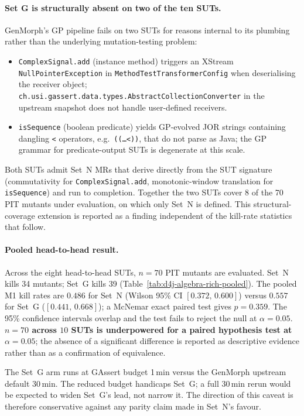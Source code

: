 \paragraph{Set G is structurally absent on two of the ten SUTs.}
GenMorph's GP pipeline fails on two SUTs for reasons internal to its
plumbing rather than the underlying mutation-testing problem:
\begin{itemize}[nosep,leftmargin=*]
  \item \texttt{ComplexSignal.add} (instance method) triggers an
        XStream \texttt{NullPointerException} in
        \texttt{MethodTestTransformerConfig} when deserialising the
        receiver object;
        \texttt{ch.usi.gassert.data.types.AbstractCollectionConverter}
        in the upstream snapshot does not handle user-defined
        receivers.
  \item \texttt{isSequence} (boolean predicate) yields GP-evolved JOR
        strings containing dangling \texttt{<} operators, e.g.\
        \texttt{((\ldots <))}, that do not parse as Java; the GP
        grammar for predicate-output SUTs is degenerate at this scale.
\end{itemize}
Both SUTs admit Set~N MRs that derive directly from the SUT signature
(commutativity for \texttt{ComplexSignal.add}, monotonic-window
translation for \texttt{isSequence}) and run to completion. Together
the two SUTs cover 8 of the 70 PIT mutants under evaluation, on which
only Set~N is defined. This structural-coverage extension is reported
as a finding independent of the kill-rate statistics that follow.

\paragraph{Pooled head-to-head result.}
Across the eight head-to-head SUTs, $n = 70$ PIT mutants are
evaluated. Set~N kills 34 mutants; Set~G kills 39
(Table~\ref{tab:d4j-algebra-rich-pooled}). The pooled M1 kill rates
are $0.486$ for Set~N (Wilson 95\% CI $[0.372,\,0.600]$) versus
$0.557$ for Set~G ($[0.441,\,0.668]$); a McNemar exact paired test
gives $p = 0.359$. The 95\% confidence intervals overlap and the test
fails to reject the null at $\alpha = 0.05$. \textbf{$n = 70$ across
$10$ SUTs is underpowered for a paired hypothesis test at
$\alpha = 0.05$}; the absence of a significant difference is reported
as descriptive evidence rather than as a confirmation of equivalence.

The Set~G arm runs at GAssert budget 1\,min versus the GenMorph
upstream default 30\,min. The reduced budget handicaps Set~G; a full
30\,min rerun would be expected to widen Set~G's lead, not narrow it.
The direction of this caveat is therefore conservative against any
parity claim made in Set~N's favour.

